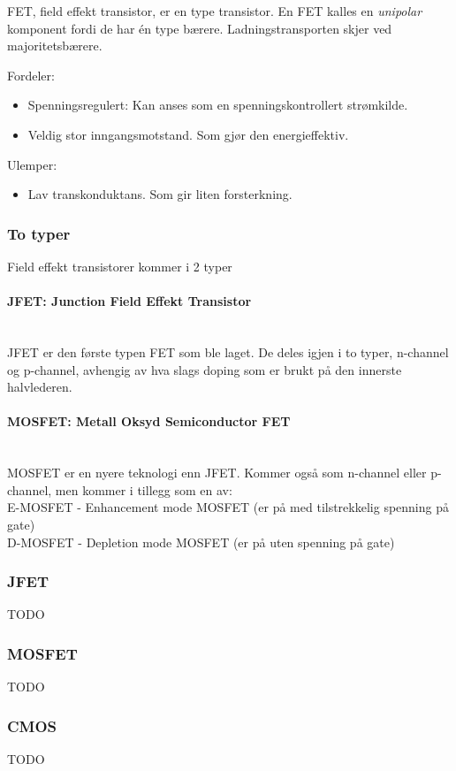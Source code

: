 FET, field effekt transistor, er en type transistor.
En FET kalles en \emph{unipolar} komponent fordi de har én type bærere.
Ladningstransporten skjer ved majoritetsbærere.

Fordeler:
\begin{itemize}
\item Spenningsregulert: Kan anses som en spenningskontrollert strømkilde.
\item Veldig stor inngangsmotstand. Som gjør den energieffektiv.
\end{itemize}

Ulemper:
\begin{itemize}
\item Lav transkonduktans. Som gir liten forsterkning.
\end{itemize}



\subsubsection{To typer}
Field effekt transistorer kommer i 2 typer
\\
\paragraph{JFET: Junction Field Effekt Transistor} \mbox{} \\
JFET er den første typen FET som ble laget.
De deles igjen i to typer, n-channel og p-channel, avhengig av hva slags doping
som er brukt på den innerste halvlederen.
\\
\paragraph{MOSFET: Metall Oksyd Semiconductor FET} \mbox{} \\
MOSFET er en nyere teknologi enn JFET.
Kommer også som n-channel eller p-channel, men kommer i tillegg som en av:\\
E-MOSFET - Enhancement mode MOSFET (er på med tilstrekkelig spenning på gate) \\
D-MOSFET - Depletion mode MOSFET (er på uten spenning på gate)



\subsubsection{JFET}
TODO

\subsubsection{MOSFET}
TODO

\subsubsection{CMOS}
TODO
